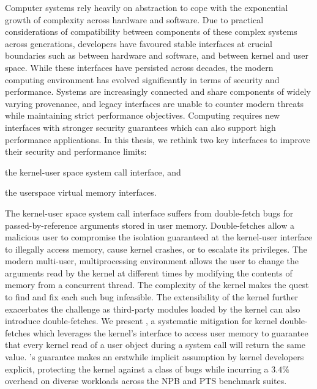 Computer systems rely heavily on abstraction to cope with the exponential
growth of complexity across hardware and software.
Due to practical considerations of compatibility between components of
these complex systems across generations, developers have favoured stable 
interfaces at crucial boundaries such as between hardware and software, 
and between kernel and user space.
While these interfaces have persisted across decades, the modern computing
environment has evolved significantly in terms of security and performance.
Systems are increasingly connected and share components of widely varying
provenance, and legacy interfaces are unable to counter modern threats
while maintaining strict performance objectives.
Computing requires new interfaces with stronger security guarantees which
can also support high performance applications.
In this thesis, we rethink two key interfaces to improve their security
and performance limits:
\begin{inparaenum}
  \item the kernel-user space system call interface, and
  \item the userspace virtual memory interfaces.
\end{inparaenum}

The kernel-user space system call interface suffers from double-fetch
bugs for passed-by-reference arguments stored in user memory.
Double-fetches allow a malicious user to compromise the isolation guaranteed 
at the kernel-user interface to illegally access memory,
cause kernel crashes, or to escalate its privileges.
The modern multi-user, multiprocessing environment allows the user to
change the arguments read by the kernel at different times by modifying
the contents of memory from a concurrent thread.
The complexity of the kernel makes the quest to find and fix each such bug
infeasible.
The extensibility of the kernel further exacerbates the challenge as 
third-party modules loaded by the kernel can also introduce double-fetches.
We present \midas, a systematic mitigation for kernel double-fetches which
leverages the kernel's interface to access user memory to guarantee that 
every kernel read of a user object during a system call will return the 
same value.
\midas's guarantee makes an erstwhile implicit assumption by kernel developers
explicit, protecting the kernel against a class of bugs while incurring
a $3.4\%$ overhead on diverse workloads across the NPB and PTS benchmark suites.

